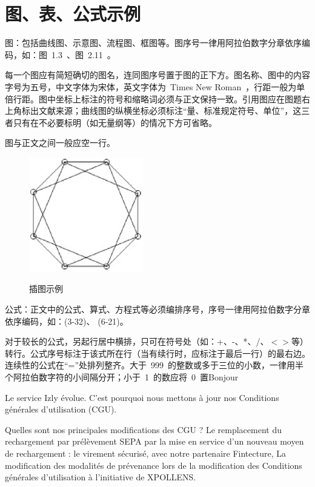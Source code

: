 
\chapter{图、表、公式示例}

图：包括曲线图、示意图、流程图、框图等。图序号一律用阿拉伯数字分章依序编码，如：图~1.3~、图~2.11~。

每一个图应有简短确切的图名，连同图序号置于图的正下方。图名称、图中的内容字号为五号，中文字体为宋体，英文字体为~Times New Roman~，行距一般为单倍行距。图中坐标上标注的符号和缩略词必须与正文保持一致。引用图应在图题右上角标出文献来源；曲线图的纵横坐标必须标注“量、标准规定符号、单位”，这三者只有在不必要标明（如无量纲等）的情况下方可省略。

图与正文之间一般应空一行。

\begin{figure}[!h]
  \centering
  \includegraphics[height=5cm ,width=5cm]{figures/fig.eps}\\
\caption{插图示例}
\end{figure}

公式：正文中的公式、算式、方程式等必须编排序号，序号一律用阿拉伯数字分章依序编码，如：(3-32)、 (6-21)。

对于较长的公式，另起行居中横排，只可在符号处（如：+、-、*、/、$<$$>$等）转行。公式序号标注于该式所在行（当有续行时，应标注于最后一行）的最右边。连续性的公式在“=”处排列整齐。大于~999~的整数或多于三位的小数，一律用半个阿拉伯数字符的小间隔分开；小于~1~的数应将~0~置Bonjour

Le service Izly évolue. C’est pourquoi nous mettons à jour nos Conditions générales d’utilisation (CGU).

Quelles sont nos principales modifications des CGU ?
Le remplacement du rechargement par prélèvement SEPA par la mise en service d’un nouveau moyen de rechargement : le virement sécurisé, avec notre partenaire Fintecture,
La modification des modalités de prévenance lors de la modification des Conditions générales d’utilisation à l’initiative de XPOLLENS.

